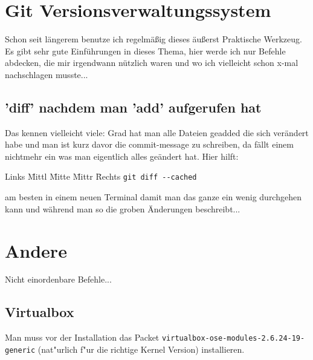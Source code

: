 \documentclass[12pt]{article}
\newenvironment{code}{\begin{tabbing}Links \= Mittl \= Mitte \= Mittr \= Rechts \kill}{\end{tabbing}}
\begin{document}
\section{Git Versionsverwaltungssystem}
Schon seit längerem benutze ich regelmäßig dieses äußerst Praktische Werkzeug.
Es gibt sehr gute Einführungen in dieses Thema, hier werde ich nur Befehle abdecken, die 
mir irgendwann nützlich waren und wo ich vielleicht schon x-mal nachschlagen musste...

\subsection{'diff' nachdem man 'add' aufgerufen hat}
Das kennen vielleicht viele: Grad hat man alle Dateien geadded die sich verändert habe und man
ist kurz davor die commit-message zu schreiben, da fällt einem nichtmehr ein was man eigentlich alles
geändert hat. Hier hilft:
\begin{code}
	\> \verb#git diff --cached#
\end{code}
am besten in einem neuen Terminal damit man das ganze ein wenig durchgehen kann und während man so
die groben Änderungen beschreibt...

\section{Andere}
Nicht einordenbare Befehle...
\subsection{Virtualbox}
Man muss vor der Installation das Packet \verb#virtualbox-ose-modules-2.6.24-19-generic# (nat"urlich 
f"ur die richtige Kernel Version) installieren.
\end{document}
